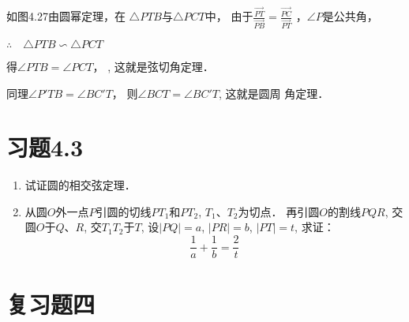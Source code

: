 如图4.27由圆幂定理，在
$\triangle PTB$与$\triangle PCT$中，
由于$\frac{\Vec{PT}}{\Vec{PB}}=\frac{\Vec{PC}}{\Vec{PT}}$
，$\angle P$是公共角，

$\therefore\quad \triangle PTB \backsim \triangle PCT$

得$\angle PTB=\angle PCT$，
, 这就是弦切角定理．

同理$\angle P'TB=\angle BC'T$，
则$\angle BCT=\angle BC'T$, 这就是圆周
角定理．


\section*{习题4.3}

\begin{enumerate}
    \item 试证圆的相交弦定理．
    \item 从圆$O$外一点$P$引圆的切线$PT_1$和$PT_2$, $T_1$、$T_2$为切点．
再引圆$O$的割线$PQR$, 交圆$O$于$Q$、$R$, 交$T_1T_2$于$T$, 
设$|PQ|=a$, $|PR|=b$, $|PT|=t$, 求证：
\[\frac{1}{a}+\frac{1}{b}=\frac{2}{t}\]
\end{enumerate}

\section*{复习题四}

